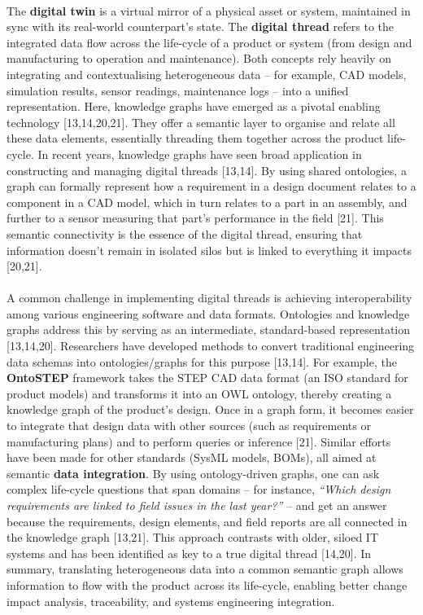         \paragraph{} The \textbf{digital twin} is a virtual mirror of a physical asset or system, maintained in sync with its real-world counterpart’s state. The \textbf{digital thread} refers to the integrated data flow across the life-cycle of a product or system (from design and manufacturing to operation and maintenance). Both concepts rely heavily on integrating and contextualising heterogeneous data – for example, CAD models, simulation results, sensor readings, maintenance logs – into a unified representation. Here, knowledge graphs have emerged as a pivotal enabling technology [13,14,20,21]. They offer a semantic layer to organise and relate all these data elements, essentially threading them together across the product life-cycle. In recent years, knowledge graphs have seen broad application in constructing and managing digital threads [13,14]. By using shared ontologies, a graph can formally represent how a requirement in a design document relates to a component in a CAD model, which in turn relates to a part in an assembly, and further to a sensor measuring that part’s performance in the field [21]. This semantic connectivity is the essence of the digital thread, ensuring that information doesn’t remain in isolated silos but is linked to everything it impacts [20,21].
        
        \newpage
        \paragraph{} A common challenge in implementing digital threads is achieving interoperability among various engineering software and data formats. Ontologies and knowledge graphs address this by serving as an intermediate, standard-based representation [13,14,20]. Researchers have developed methods to convert traditional engineering data schemas into ontologies/graphs for this purpose [13,14]. For example, the \textbf{OntoSTEP} framework takes the STEP CAD data format (an ISO standard for product models) and transforms it into an OWL ontology, thereby creating a knowledge graph of the product’s design. Once in a graph form, it becomes easier to integrate that design data with other sources (such as requirements or manufacturing plans) and to perform queries or inference [21]. Similar efforts have been made for other standards (SysML models, BOMs), all aimed at semantic \textbf{ data integration}. By using ontology-driven graphs, one can ask complex life-cycle questions that span domains – for instance, \textit{“Which design requirements are linked to field issues in the last year?”} – and get an answer because the requirements, design elements, and field reports are all connected in the knowledge graph [13,21]. This approach contrasts with older, siloed IT systems and has been identified as key to a true digital thread [14,20]. In summary, translating heterogeneous data into a common semantic graph allows information to flow with the product across its life-cycle, enabling better change impact analysis, traceability, and systems engineering integration.
        
